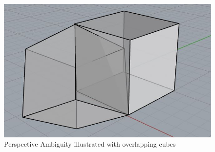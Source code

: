 \begin{figure}
\centering
\includegraphics[width=\columnwidth]{figs/perspective_fig}
\caption{Perspective Ambiguity illustrated with overlapping cubes}
\label{fig:calib}
\end{figure}
